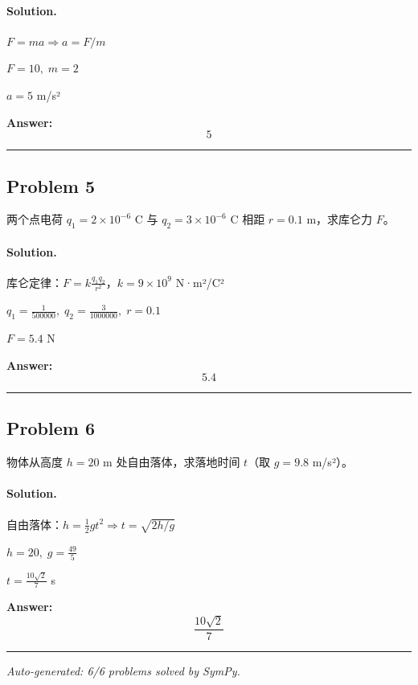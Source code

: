 \documentclass[12pt, a4paper]{ctexart}
\newcommand{\problem}[1]{\subsection*{Problem #1}}
\newcommand{\solution}{\paragraph{Solution.}}
\begin{document}
\solution

$F = ma \Rightarrow a = F/m$

$F = 10,\; m = 2$

$a = 5$ m/s²

\textbf{Answer:}
\[\boxed{5}\]

\vspace{1em}
\hrule
\vspace{1em}

\problem{5}

两个点电荷 $q_1 = 2 \times 10^{-6}$ C 与 $q_2 = 3 \times 10^{-6}$ C 相距 $r = 0.1$ m，求库仑力 $F$。

\solution

库仑定律：$F = k \frac{q_1 q_2}{r^2}$，$k = 9\times 10^9$ N·m²/C²

$q_1 = \frac{1}{500000},\; q_2 = \frac{3}{1000000},\; r = 0.1$

$F = 5.4$ N

\textbf{Answer:}
\[\boxed{5.4}\]

\vspace{1em}
\hrule
\vspace{1em}

\problem{6}

物体从高度 $h = 20$ m 处自由落体，求落地时间 $t$（取 $g = 9.8$ m/s²）。

\solution

自由落体：$h = \frac{1}{2} g t^2 \Rightarrow t = \sqrt{2h/g}$

$h = 20,\; g = \frac{49}{5}$

$t = \frac{10 \sqrt{2}}{7}$ s

\textbf{Answer:}
\[\boxed{\frac{10 \sqrt{2}}{7}}\]

\vspace{1em}
\hrule
\vspace{1em}


\vspace{2em}
\noindent\textit{Auto-generated: 6/6 problems solved by SymPy.}
\end{document}
